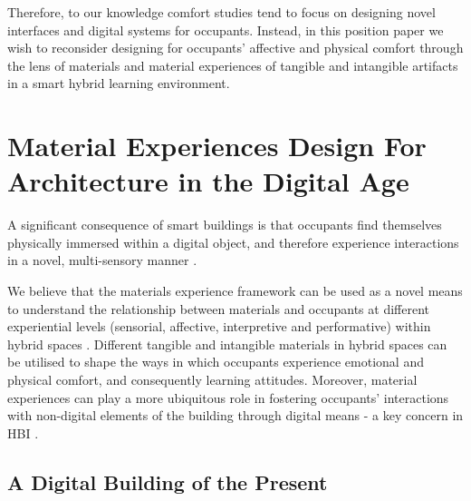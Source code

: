 \documentclass[manuscript, anonymous, review]{acmart}
\begin{document}
Therefore, to our knowledge comfort studies tend to focus on designing novel interfaces and digital systems for occupants. Instead, in this position paper we wish to reconsider designing for occupants' affective and physical comfort through the lens of materials and material experiences of tangible and intangible artifacts in a smart hybrid learning environment. 


\section{Material Experiences Design For Architecture in the Digital Age}

A significant consequence of smart buildings is that occupants find themselves physically immersed within a digital object, and therefore experience interactions in a novel, multi-sensory manner \cite{nembrini2017human}. 

We believe that the materials experience framework can be used as a novel means to understand the relationship between materials and occupants at different experiential levels (sensorial, affective, interpretive and performative) within hybrid spaces \cite{giaccardi2015foundations}. Different tangible and intangible materials in hybrid spaces can be utilised to shape the ways in which occupants experience emotional and physical comfort, and consequently learning attitudes. Moreover, material
experiences can play a more ubiquitous role in fostering occupants' interactions with non-digital elements of the building through digital means - a key concern in HBI \cite{nembrini2017human}. 

\subsection{A Digital Building of the Present}

  
\end{document}
